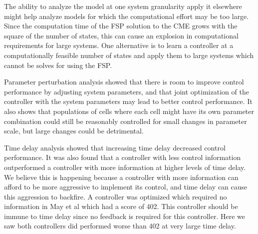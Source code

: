 \documentclass[12pt]{article}
\begin{document}
The ability to analyze the model at one system granularity apply it elsewhere might help analyze models for which the computational effort may be too large. Since the computation time of the FSP solution to the CME grows with the square of the number of states, this can cause an explosion in computational requirements for large systems. One alternative is to learn a controller at a computationally feasible number of states and apply them to large systems which cannot be solves for using the FSP. 

Parameter perturbation analysis showed that there is room to improve control performance by adjusting system parameters, and that joint optimization of the controller with the system parameters may lead to better control performance. It also shows that populations of cells where each cell might have its own parameter combination could still be reasonably controlled for small changes in parameter scale, but large changes could be detrimental.

Time delay analysis showed that increasing time delay decreased control performance. It was also found that a controller with less control information outperformed a controller with more information at higher levels of time delay. We believe this is happening because a controller with more information can afford to be more aggressive to implement its control, and time delay can cause this aggression to backfire. A controller was optimized which required no information in May et al which had a score of 402. This controller should be immune to time delay since no feedback is required for this controller. Here we saw both controllers did performed worse than 402 at very large time delay.
\end{document}
